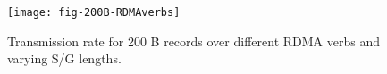 \begin{figure}[t]
\texttt{[image: fig-200B-RDMAverbs]}
\caption{Transmission rate for 200 B records over different RDMA verbs and 
varying S/G lengths.}
\label{fig:200B_transrate}
\end{figure}

